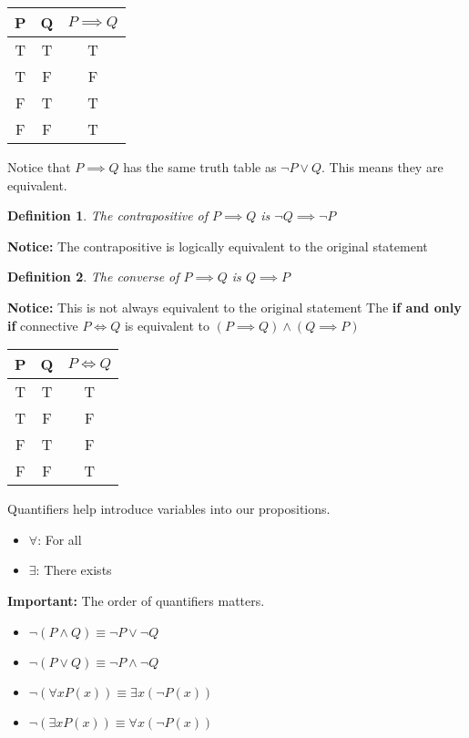 \documentclass{article}
\newtheorem{definition}{Definition}
\begin{document}
\begin{center}
    \begin{tabular}{c|c|c} 
     P & Q & $P \implies Q$ \\
     \hline
     T & T & T \\ 
     T & F & F \\
     F & T & T \\
     F & F & T \\ 

    \end{tabular}
\end{center}
Notice that $P \implies Q$ has the same truth table as $\lnot P \lor Q$. This means they are equivalent.
\begin{definition}
    The contrapositive of $P \implies Q$ is $\lnot Q \implies \lnot P$
\end{definition}
\textbf{Notice: }The contrapositive is logically equivalent to the original statement
\begin{definition}
    The converse of $P \implies Q$ is $Q \implies P$
\end{definition}
\textbf{Notice: }This is not always equivalent to the original statement
The \textbf{if and only if} connective $P \iff Q$ is equivalent to $(P \implies Q) \land (Q \implies P)$
\begin{center}
    \begin{tabular}{c|c|c} 
     P & Q & $P \iff Q$ \\
     \hline
     T & T & T \\ 
     T & F & F \\
     F & T & F \\
     F & F & T \\ 
    \end{tabular}
\end{center}
Quantifiers help introduce variables into our propositions.
\begin{itemize}
    \item $\forall$: For all
    \item $\exists$: There exists
\end{itemize}
\textbf{Important: }The order of quantifiers matters.
\begin{itemize}
    \item $\lnot(P \land Q) \equiv \lnot P \lor \lnot Q$
    \item $\lnot(P \lor Q) \equiv \lnot P \land \lnot Q$
    \item $\lnot(\forall x P(x)) \equiv \exists x (\lnot P(x))$
    \item $\lnot(\exists x P(x)) \equiv \forall x (\lnot P(x))$
\end{itemize}
\end{document}
